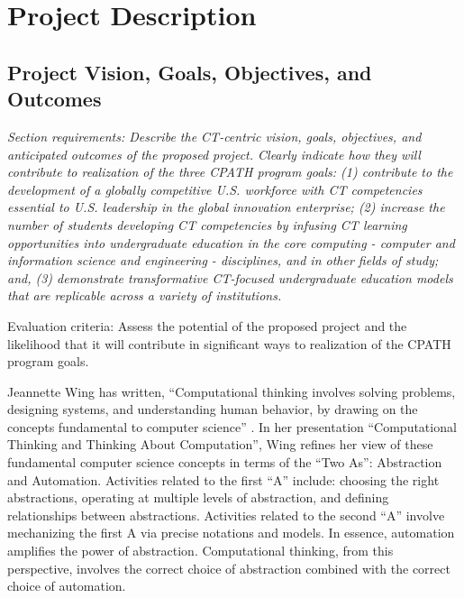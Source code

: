 
\renewcommand{\thepage} {C--\arabic{page}}

\renewcommand{\thesection} {C.\arabic{section}}
\setcounter{section}{0}

\section{Project Description}

\subsection{Project Vision, Goals, Objectives, and Outcomes}

{\em Section requirements: Describe the CT-centric vision, goals,
objectives, and anticipated outcomes of the proposed project. Clearly
indicate how they will contribute to realization of the three CPATH program
goals: (1) contribute to the development of a globally competitive
U.S. workforce with CT competencies essential to U.S. leadership in the
global innovation enterprise; (2) increase the number of students
developing CT competencies by infusing CT learning opportunities into
undergraduate education in the core computing - computer and information
science and engineering - disciplines, and in other fields of study; and,
(3) demonstrate transformative CT-focused undergraduate education models
that are replicable across a variety of institutions.

Evaluation criteria: Assess the potential of the proposed project and the
likelihood that it will contribute in significant ways to realization of
the CPATH program goals.
}
\bigskip

Jeannette Wing has written, ``Computational thinking involves solving
problems, designing systems, and understanding human behavior, by drawing
on the concepts fundamental to computer science'' \citep{Wing06}.  In her
presentation ``Computational Thinking and Thinking About Computation'',
Wing refines her view of these fundamental computer science concepts in terms of 
the ``Two As'': Abstraction and Automation.  Activities
related to the first ``A'' include: choosing the right abstractions, operating
at multiple levels of abstraction, and defining relationships between
abstractions.  Activities related to the second ``A'' involve mechanizing the
first A via precise notations and models.  In essence, automation amplifies
the power of abstraction.  Computational thinking, from this perspective,
involves the correct choice of abstraction combined with the correct choice
of automation.

